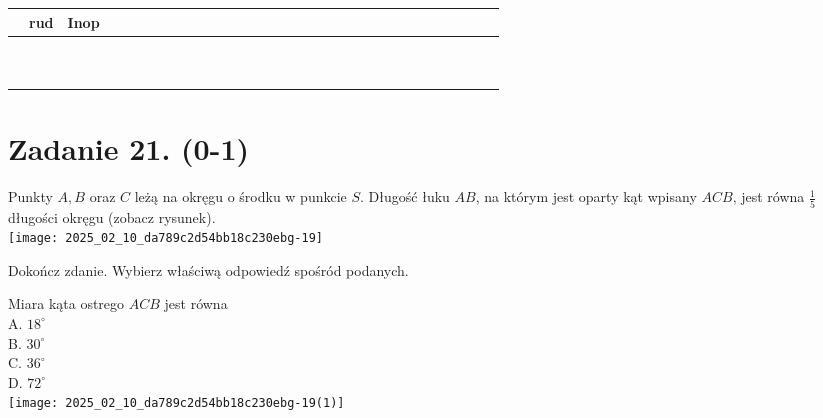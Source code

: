 \documentclass[10pt]{article}
\begin{document}
\begin{center}
\begin{tabular}{|c|c|c|c|c|c|c|c|c|c|c|c|c|c|c|c|c|c|c|c|c|c|c|c|c|c|c|c|c|c|c|}
\hline
 & rud & Inop &  &  &  &  &  &  &  &  &  &  &  &  &  &  &  &  &  &  &  &  &  &  &  &  &  &  &  &  \\
\hline
 &  &  &  &  &  &  &  &  &  &  &  &  &  &  &  &  &  &  &  &  &  &  &  &  &  &  &  &  &  &  \\
\hline
 &  &  &  &  &  &  &  &  &  &  &  &  &  &  &  &  &  &  &  &  &  &  &  &  &  &  &  &  &  &  \\
\hline
 &  &  &  &  &  &  &  &  &  &  &  &  &  &  &  &  &  &  &  &  &  &  &  &  &  &  &  &  &  &  \\
\hline
 &  &  &  &  &  &  &  &  &  &  &  &  &  &  &  &  &  &  &  &  &  &  &  &  &  &  &  &  &  &  \\
\hline
 &  &  &  &  &  &  &  &  &  &  &  &  &  &  &  &  &  &  &  &  &  &  &  &  &  &  &  &  &  &  \\
\hline
 &  &  &  &  &  &  &  &  &  &  &  &  &  &  &  &  &  &  &  &  &  &  &  &  &  &  &  &  &  &  \\
\hline
 &  &  &  &  &  &  &  &  &  &  &  &  &  &  &  &  &  &  &  &  &  &  &  &  &  &  &  &  &  &  \\
\hline
 &  &  &  &  &  &  &  &  &  &  &  &  &  &  &  &  &  &  &  &  &  &  &  &  &  &  &  &  &  &  \\
\hline
 &  &  &  &  &  &  &  &  &  &  &  &  &  &  &  &  &  &  &  &  &  &  &  &  &  &  &  &  &  &  \\
\hline
 &  &  &  &  &  &  &  &  &  &  &  &  &  &  &  &  &  &  &  &  &  &  &  &  &  &  &  &  &  &  \\
\hline
\end{tabular}
\end{center}

\section*{Zadanie 21. (0-1)}
Punkty \(A, B\) oraz \(C\) leżą na okręgu o środku w punkcie \(S\). Długość łuku \(A B\), na którym jest oparty kąt wpisany \(A C B\), jest równa \(\frac{1}{5}\) długości okręgu (zobacz rysunek).\\
\texttt{[image: 2025\_02\_10\_da789c2d54bb18c230ebg-19]}

Dokończ zdanie. Wybierz właściwą odpowiedź spośród podanych.

Miara kąta ostrego \(A C B\) jest równa\\
A. \(18^{\circ}\)\\
B. \(30^{\circ}\)\\
C. \(36^{\circ}\)\\
D. \(72^{\circ}\)\\
\texttt{[image: 2025\_02\_10\_da789c2d54bb18c230ebg-19(1)]}
\end{document}
